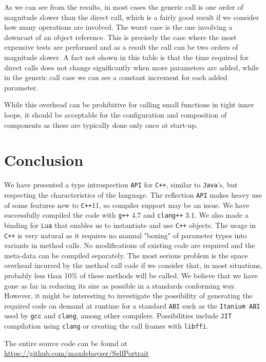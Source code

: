As we can see from the results, in most cases the generic call is one order of magnitude slower than the direct call, which is a fairly good result
if we consider how many operations are involved. The worst case is the one involving a downcast of an object reference. This is precisely the case
where the most expensive tests are performed and as a result the call can be two orders of magnitude slower. A fact not shown in this table is that
the time required for direct calls does not change significantly when more parameters are added, while in the generic call case we can see a
constant increment for each added parameter.

While this overhead can be prohibitive for calling small functions in tight inner loops, it should be acceptable for the configuration and composition
of components as these are typically done only once at start-up.


\section{Conclusion}
\label{conclusion}

We have presented a type introspection \texttt{API} for \texttt{C++}, similar to \texttt{Java}'s, but respecting the characteristics of the language.
The reflection \texttt{API} makes heavy use of some features new to \texttt{C++}11, so compiler support may be an issue. We have successfully
compiled the code with \texttt{g++} 4.7 and \texttt{clang++} 3.1.
We also made a binding for \texttt{Lua} that enables us to instantiate and use \texttt{C++} objects.
The usage in \texttt{C++} is very natural as it requires no manual "boxing" of parameter types into variants in method calls.
No modifications of existing code are required and the meta-data can be compiled separately.
The most serious problem is the space overhead incurred by the method call code if we consider that, in most situations,
probably less than 10\% of these methods will be called. We believe that we have gone as far in reducing its size as possible
in a standards conforming way. However, it might be interesting to investigate the possibility of generating the required
code on demand at runtime for a standard \texttt{ABI} such as the \texttt{Itanium ABI} used by \texttt{gcc} and \texttt{clang}, among other compilers.
Possibilities include \texttt{JIT} compilation using \texttt{clang} or creating the call frames with \texttt{libffi}.

The entire source code can be found at \url{https://github.com/maxdebayser/SelfPortrait}